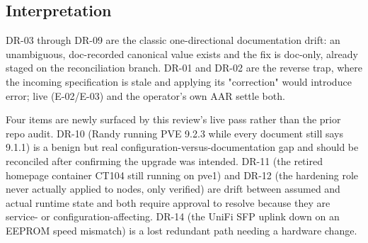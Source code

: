 \subsection{Interpretation}

DR-03 through DR-09 are the classic one-directional documentation drift: an unambiguous, doc-recorded canonical value exists and the fix is doc-only, already staged on the reconciliation branch. DR-01 and DR-02 are the reverse trap, where the incoming specification is stale and applying its "correction" would introduce error; live  (E-02/E-03) and the operator's own AAR settle both.

Four items are newly surfaced by this review's live pass rather than the prior repo audit. DR-10 (Randy running PVE 9.2.3 while every document still says 9.1.1) is a benign but real configuration-versus-documentation gap and should be reconciled after confirming the upgrade was intended. DR-11 (the retired homepage container CT104 still running on pve1) and DR-12 (the hardening role never actually applied to nodes, only  verified) are drift between assumed and actual runtime state and both require approval to resolve because they are service- or configuration-affecting. DR-14 (the UniFi SFP uplink down on an EEPROM speed mismatch) is a lost redundant path needing a hardware change.
